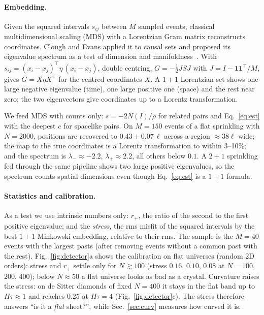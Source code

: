 \documentclass[11pt,a4paper]{article}
\begin{document}
\paragraph{Embedding.} Given the squared intervals $s_{ij}$ between $M$ sampled events, classical multidimensional scaling (MDS) with a Lorentzian Gram matrix reconstructs coordinates. Clough and Evans applied it to causal sets and proposed its eigenvalue spectrum as a test of dimension and manifoldness~\cite{CloughEvans16,Clough17}. With $s_{ij}=(x_i-x_j)^{\!\top}\eta\,(x_i-x_j)$, double centring, $G=-\tfrac12JSJ$ with $J=I-\mathbf1\mathbf1^{\!\top}/M$, gives $G=X\eta X^{\!\top}$ for the centred coordinates $X$. A $1+1$ Lorentzian set shows one large negative eigenvalue (time), one large positive one (space) and the rest near zero; the two eigenvectors give coordinates up to a Lorentz transformation.

We feed MDS with counts only: $s=-2N(I)/\rho$ for related pairs and Eq.~\eqref{eq:est} with the deepest $c$ for spacelike pairs. On $M=150$ events of a flat sprinkling with $N=2000$, positions are recovered to $0.43\pm0.07\,\ell$ across a region $\approx38\ell$ wide; the map to the true coordinates is a Lorentz transformation to within 3--10\%; and the spectrum is $\lambda_-\approx-2.2$, $\lambda_+\approx2.2$, all others below $0.1$. A $2+1$ sprinkling fed through the same pipeline shows two large positive eigenvalues, so the spectrum counts spatial dimensions even though Eq.~\eqref{eq:est} is a $1+1$ formula.

\paragraph{Statistics and calibration.} As a test we use intrinsic numbers only: $r_+$, the ratio of the second to the first positive eigenvalue; and the \emph{stress}, the rms misfit of the squared intervals by the best $1+1$ Minkowski embedding, relative to their rms. The sample is the $M=40$ events with the largest pasts (after removing events without a common past with the rest). Fig.~\ref{fig:detector}a shows the calibration on flat universes (random 2D orders): stress and $r_+$ settle only for $N\gtrsim100$ (stress $0.16$, $0.10$, $0.08$ at $N=100$, $200$, $400$); below $N\approx50$ a flat universe looks as bad as a crystal. Curvature raises the stress: on de Sitter diamonds of fixed $N=400$ it stays in the flat band up to $H\tau\approx1$ and reaches $0.25$ at $H\tau=4$ (Fig.~\ref{fig:detector}c). The stress therefore answers ``is it a \emph{flat} sheet?'', while Sec.~\ref{sec:curv} measures how curved it is.
\end{document}
